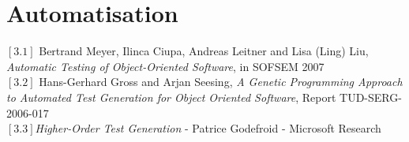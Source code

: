 \documentclass[a4paper]{report}
\begin{document}
\section*{Automatisation}

$[3.1]$ Bertrand Meyer, Ilinca Ciupa, Andreas Leitner and Lisa (Ling) Liu, \textit{Automatic Testing of Object-Oriented Software}, in SOFSEM 2007\\
\newline
$[3.2]$ Hans-Gerhard Gross and Arjan Seesing, 
\textit{A Genetic Programming Approach to Automated Test Generation for Object Oriented Software}, Report TUD-SERG-2006-017\\
\newline
$[3.3]$\textit{Higher-Order Test Generation} - 
Patrice Godefroid - 
Microsoft Research\\
\newline
\end{document}
